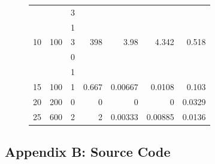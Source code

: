 \documentclass[a4paper]{article}
\begin{document}
\begin{figure}[H]
\begin{center}
\begin{adjustwidth}{-3.75cm}{}
\begin{tabular}{|r|r|r|r|r|r|r|}
        & & 3 & & & & \\
        & & 1 & & & & \\
        10 & 100 & 3 & 398 & 3.98 & 4.342 & \num{0.518} \\
        \hline
        & & 0 & & & & \\
        & & 1 & & & & \\
        15 & 100 & 1 & 0.667 & \num{0.00667} & \num{0.0108} & \num{0.103} \\
        \hline
        20 & 200 & 0 & 0 & 0 & 0 & \num{0.0329} \\
        \hline
        25 & 600 & 2 & 2 & \num{0.00333} & \num{0.00885} & \num{0.0136} \\
        \hline
      \end{tabular}
    \end{adjustwidth}
  \end{center}
  \label{tab:scatRatesAl}
\end{figure}

\subsection{Appendix B: Source Code}
\end{document}

